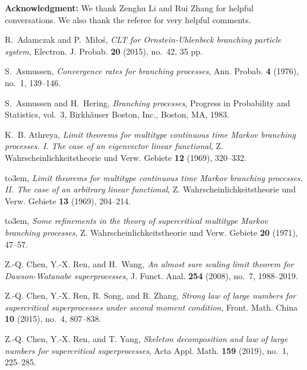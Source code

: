 \documentclass[12pt,a4paper]{amsart}
\theoremstyle{plain}
\theoremstyle{definition}
\numberwithin{equation}{section}
\begin{document}
\medskip
\noindent
{\bf Acknowledgment:}
We thank Zenghu Li and Rui Zhang for helpful conversations.
We also thank the referee for very helpful comments.
\medskip

\providecommand{\bysame}{\leavevmode\hbox to3em{\hrulefill}\thinspace}
\begin{thebibliography}{10}

R.~Adamczak and P.~Mi{\l}o\'{s}, \emph{C{LT} for {O}rnstein-{U}hlenbeck branching particle system},
  Electron. J. Probab. \textbf{20} (2015), no.~42, 35 pp.

  S.~Asmussen, \emph{Convergence rates for branching processes}, Ann.
  Probab.  \textbf{4} (1976), no.~1, 139--146.

S.~Asmussen and H.~Hering, \emph{Branching processes}, Progress in Probability
  and Statistics, vol.~3, Birkh\"{a}user Boston, Inc., Boston, MA, 1983.

K.~B. Athreya, \emph{Limit theorems for multitype continuous time {M}arkov
  branching processes. {I}. {T}he case of an eigenvector linear functional}, Z.
  Wahrscheinlichkeitstheorie und Verw. Gebiete \textbf{12} (1969), 320--332.

\bysame, \emph{Limit theorems for multitype continuous time {M}arkov branching
  processes. {II}. {T}he case of an arbitrary linear functional}, Z.
  Wahrscheinlichkeitstheorie und Verw. Gebiete \textbf{13} (1969), 204--214.

\bysame, \emph{Some refinements in the theory of supercritical multitype
  {M}arkov branching processes}, Z. Wahrscheinlichkeitstheorie und Verw.
  Gebiete \textbf{20} (1971), 47--57.


Z.-Q. Chen, Y.-X. Ren, and H.~Wang, \emph{An almost sure scaling limit theorem
  for {D}awson-{W}atanabe superprocesses}, J. Funct. Anal. \textbf{254} (2008),
  no.~7, 1988--2019.

  Z.-Q. Chen, Y.-X. Ren, R. Song, and R. Zhang,
 \emph{Strong law of large numbers for supercritical superprocesses under second moment condition}, Front. Math. China \textbf{10} (2015), no.~4, 807--838.


  Z.-Q. Chen, Y.-X. Ren,  and T. Yang,
 \emph{Skeleton decomposition and law of large numbers for supercritical superprocesses}, Acta Appl. Math. \textbf{159} (2019), no.~1, 225--285.


\end{thebibliography}
\end{document}
